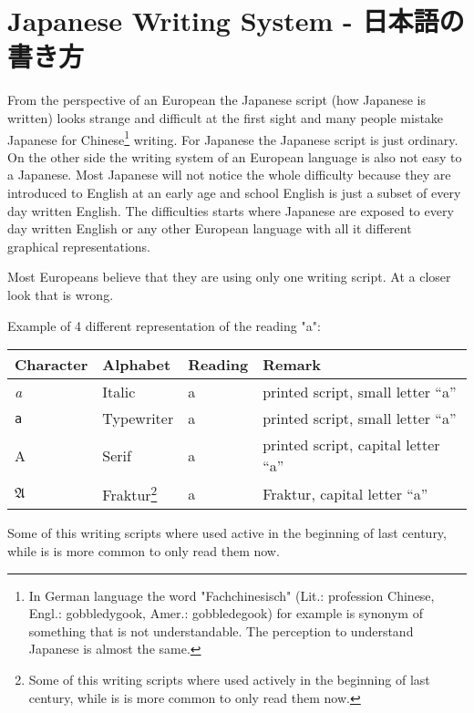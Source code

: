 \chapter{Japanese Writing System - 日本語の書き方}\label{chap:JapaneseWritingSystem}

From the perspective of an European the Japanese script (how Japanese is
written) looks strange and difficult at the first sight and many people mistake
Japanese for Chinese\footnote{In German language the word "Fachchinesisch"
(Lit.: profession Chinese, Engl.: gobbledygook, Amer.: gobbledegook) for
example is synonym of something that is not understandable. The perception to
understand Japanese is almost the same.} writing.  For Japanese the Japanese
script is just ordinary. On the other side the writing system of an European
language is also not easy to a Japanese. Most Japanese will not notice the
whole difficulty because they are introduced to English at an early age and
school English is just a subset of every day written English. The difficulties
starts where Japanese are exposed to every day written English or any other
European language with all it different graphical representations.

Most Europeans believe that they are using only one writing script. At a closer
look that is wrong.

\bigskip Example of 4 different representation of the reading "a":

\begin{center}
\begin{tabular}{|l|l|l|l|}
\textbf{Character}&\textbf{Alphabet}&\textbf{Reading}&\textbf{Remark}\\\hline
\textit{a}     &  Italic        & a & printed script, small letter ``a'' \\ 
\texttt{a}     &  Typewriter    & a & printed script, small letter ``a'' \\ 
A              &  Serif         & a & printed script, capital letter ``a'' \\ 
$\mathfrak{A}$ & Fraktur\footnote{Some of this writing scripts where used 
actively in the beginning of last century, while is is more common to only 
read them now.}& a & Fraktur, capital letter ``a''  \\ 
\end{tabular}
\end{center}

Some of this writing scripts where used active in the beginning of last
century, while is is more common to only read them now. 

